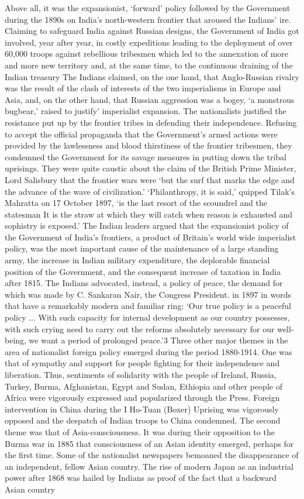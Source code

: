 Above all, it was the expansionist, `forward' policy followed by the Government during the 1890s on India's north-western frontier that aroused the Indians' ire. Claiming to safeguard India against Russian designs, the Government of India got involved, year after year, in costly expeditions leading to the deployment of over 60,000 troops against rebellious tribesmen which led to the annexation of more and more new territory and, at the same time, to the continuous draining of the Indian treasury The Indians claimed, on the one hand, that Anglo-Russian rivalry was the result of the clash of interests of the two imperialisms in Europe and Asia, and, on the other hand, that Russian aggression was a bogey, `a monstrous bugbear,' raised to justify' imperialist expansion. The nationalists justified the resistance put up by the frontier tribes in defending their independence. Refusing to accept the official propaganda that the Government's armed actions were provided by the lawlessness and blood­ thirstiness of the frontier tribesmen, they condemned the Government for its savage measures in putting down the tribal uprisings. They were quite caustic about the claim of the British Prime Minister, Lord Salisbury that the frontier wars were `but the surf that marks the edge and the advance of the wave of civilization.' `Philanthropy, it is said,' quipped Tilak's Mahratta on 17 October 1897, `is the last resort of the scoundrel and the statesman It is the straw at which they will catch when reason is exhausted and sophistry is exposed.' The Indian leaders argued that the expansionist policy of the Government of India's frontiers, a product of Britain's world­ wide imperialist policy, was the most important cause of the maintenance of a large standing army, the increase in Indian military expenditure, the deplorable financial position of the Government, and the consequent increase of taxation in India after 1815. The Indians advocated, instead, a policy of peace, the demand for which was made by C. Sankaran Nair, the Congress President. in 1897 in words that have a remarkably modern and familiar ring: `Our true policy is a peaceful policy ... With such capacity for internal development as our country possesses, with such crying need to carry out the reforms absolutely necessary for our well-being, we want a period of prolonged peace.'3 Three other major themes in the area of nationalist foreign policy emerged during the period 1880-1914. One was that of sympathy and support for people fighting for their independence and liberation. Thus, sentiments of solidarity with the people of Ireland, Russia, Turkey, Burma, Afghanistan, Egypt and Sudan, Ethiopia and other people of Africa were vigorously expressed and popularized through the Press. Foreign intervention in China during the I Ho-Tuan (Boxer) Uprising was vigorously opposed and the despatch of Indian troops to China condemned. The second theme was that of Asia-consciousness. It was during their opposition to the Burma war in 1885 that consciousness of an Asian identity emerged, perhaps for the first time. Some of the nationalist newspapers bemoaned the disappearance of an independent, fellow Asian country. The rise of modern Japan as an industrial power after 1868 was hailed by Indians as proof of the fact that a backward Asian country 